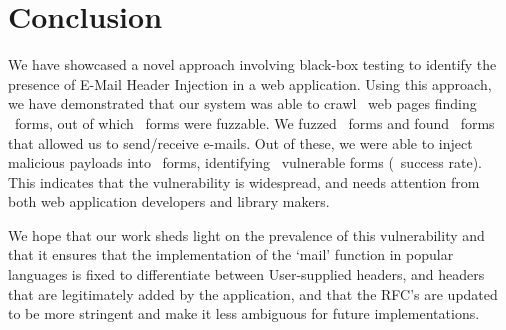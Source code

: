 \chapter{Conclusion}
We have showcased a novel approach involving black-box testing to identify the presence of E-Mail Header Injection in a web application. Using this approach, we have demonstrated that our system was able to crawl \urls\ web pages finding \forms\ forms, out of which \emailforms\ forms were fuzzable. We fuzzed \fuzzed\ forms and found \recd\  forms that allowed us to send/receive e-mails. Out of these, we were able to inject malicious payloads into \malfuzzed\ forms, identifying \success\ vulnerable forms (\successDelta\ success rate). This indicates that the vulnerability is widespread, and needs attention from both web application developers and library makers. 

We hope that our work sheds light on the prevalence of this vulnerability and that it ensures that the implementation of the `mail' function in popular languages is fixed to differentiate between User-supplied headers, and headers that are legitimately added by the application, and that the RFC's are updated to be more stringent and make it less ambiguous for future implementations. 